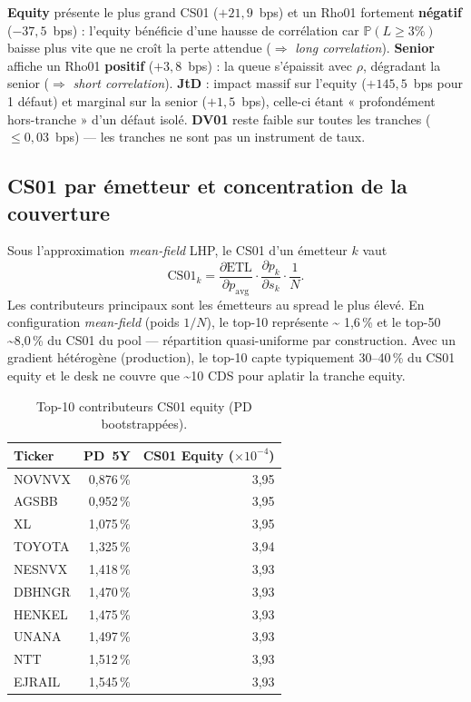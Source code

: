 \documentclass[11pt,a4paper]{article}
\newcommand{\Prob}{\mathbb{P}}
\newcommand{\ETL}{\mathrm{ETL}}
\begin{document}
\begin{callout}
\textbf{Equity} présente le plus grand CS01 ($+21{,}9$~bps) et un Rho01 fortement
\textbf{négatif} ($-37{,}5$~bps) : l'equity bénéficie d'une hausse de corrélation
car $\Prob(L \ge 3\%)$ baisse plus vite que ne croît la perte attendue
($\Rightarrow$ \emph{long correlation}). \textbf{Senior} affiche un Rho01
\textbf{positif} ($+3{,}8$~bps) : la queue s'épaissit avec $\rho$, dégradant la
senior ($\Rightarrow$ \emph{short correlation}). \textbf{JtD} : impact massif sur
l'equity ($+145{,}5$~bps pour 1 défaut) et marginal sur la senior ($+1{,}5$~bps),
celle-ci étant « profondément hors-tranche » d'un défaut isolé. \textbf{DV01}
reste faible sur toutes les tranches ($\le 0{,}03$~bps) --- les tranches ne sont
pas un instrument de taux.
\end{callout}

\subsection{CS01 par émetteur et concentration de la couverture}
Sous l'approximation \emph{mean-field} LHP, le CS01 d'un émetteur $k$ vaut
\begin{equation}
\text{CS01}_k =
\frac{\partial \ETL}{\partial p_{\text{avg}}}
\cdot
\frac{\partial p_k}{\partial s_k}
\cdot
\frac{1}{N}.
\label{eq:cs01_namelevel}
\end{equation}
Les contributeurs principaux sont les émetteurs au spread le plus élevé. En
configuration \emph{mean-field} (poids $1/N$), le top-10 représente \textasciitilde
1,6\,\% et le top-50 \textasciitilde 8,0\,\% du CS01 du pool --- répartition
quasi-uniforme par construction. Avec un gradient hétérogène (production), le
top-10 capte typiquement 30--40\,\% du CS01 equity et le desk ne couvre que
\textasciitilde 10 CDS pour aplatir la tranche equity.

\begin{table}[H]
\centering
\small
\begin{tabular}{lrr}
\toprule
\textbf{Ticker} & \textbf{PD~5Y} & \textbf{CS01 Equity} ($\times 10^{-4}$) \\
\midrule
NOVNVX  & 0,876\,\% & 3,95 \\
AGSBB   & 0,952\,\% & 3,95 \\
XL      & 1,075\,\% & 3,95 \\
TOYOTA  & 1,325\,\% & 3,94 \\
NESNVX  & 1,418\,\% & 3,93 \\
DBHNGR  & 1,470\,\% & 3,93 \\
HENKEL  & 1,475\,\% & 3,93 \\
UNANA   & 1,497\,\% & 3,93 \\
NTT     & 1,512\,\% & 3,93 \\
EJRAIL  & 1,545\,\% & 3,93 \\
\bottomrule
\end{tabular}
\caption{Top-10 contributeurs CS01 equity (PD bootstrappées).}
\end{table}
\end{document}
